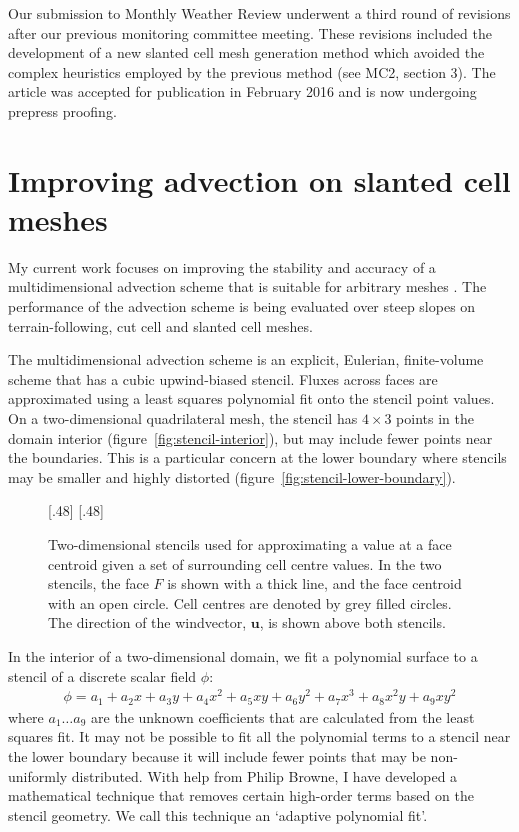 \documentclass[a4paper,11pt]{article}
\begin{document}
Our submission to Monthly Weather Review underwent a third round of revisions after our previous monitoring committee meeting.  These revisions included the development of a new slanted cell mesh generation method which avoided the complex heuristics employed by the previous method (see MC2, section 3).  The article was accepted for publication in February 2016 and is now undergoing prepress proofing.

\section{Improving advection on slanted cell meshes}
My current work focuses on improving the stability and accuracy of a multidimensional advection scheme that is suitable for arbitrary meshes \citep{weller-shahrokhi2014}.  The performance of the advection scheme is being evaluated over steep slopes on terrain-following, cut cell and slanted cell meshes.

The multidimensional advection scheme is an explicit, Eulerian, finite-volume scheme that has a cubic upwind-biased stencil.  Fluxes across faces are approximated using a least squares polynomial fit onto the stencil point values.
On a two-dimensional quadrilateral mesh, the stencil has $4 \times 3$ points in the domain interior (figure~\ref{fig:stencil-interior}), but may include fewer points near the boundaries.  This is a particular concern at the lower boundary where stencils may be smaller and highly distorted (figure~\ref{fig:stencil-lower-boundary}).

\begin{figure}
	\centering
	[.48\linewidth]{}
	[.48\linewidth]{\vspace*{2em}}
	\caption{Two-dimensional stencils used for approximating a value at a face centroid given a set of surrounding cell centre values.  In the two stencils, the face $F$ is shown with a thick line, and the face centroid with an open circle. Cell centres are denoted by grey filled circles.  The direction of the windvector, $\bm{u}$, is shown above both stencils.}
	\label{fig:stencils}
\end{figure}

In the interior of a two-dimensional domain, we fit a polynomial surface to a stencil of a discrete scalar field $\phi$:
\begin{align}
	\phi = a_1 + a_2 x + a_3 y + a_4 x^2 + a_5 x y + a_6 y^2 + a_7 x^3 + a_8 x^2 y + a_9 x y^2
\end{align}
where $a_1 \ldots a_9$ are the unknown coefficients that are calculated from the least squares fit.  It may not be possible to fit all the polynomial terms to a stencil near the lower boundary because it will include fewer points that may be non-uniformly distributed.  With help from Philip Browne, I have developed a mathematical technique that removes certain high-order terms based on the stencil geometry.  We call this technique an `adaptive polynomial fit'.
\end{document}
